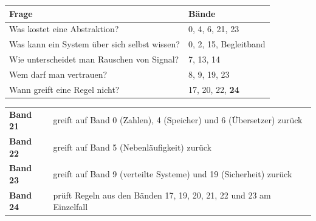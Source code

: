 \begin{technik}
\begin{center}
{\small
\renewcommand{\arraystretch}{1.45}
\begin{tabular}{@{}P{4.0cm}P{4.8cm}@{}}
\toprule
\textbf{Frage} & \textbf{Bände}\\
\midrule
Was kostet eine Abstraktion? & 0, 4, 6, 21, 23\\
Was kann ein System über sich selbst wissen? & 0, 2, 15, Begleitband\\
Wie unterscheidet man Rauschen von Signal? & 7, 13, 14\\
Wem darf man vertrauen? & 8, 9, 19, 23\\
Wann greift eine Regel nicht? & 17, 20, 22, \textbf{24}\\
\bottomrule
\end{tabular}}
\end{center}

\begin{center}
\begin{minipage}{0.86\textwidth}
\end{minipage}
\end{center}
\end{technik}

\begin{merksatz}
\begin{center}
{\small
\renewcommand{\arraystretch}{1.45}
\begin{tabular}{@{}P{2.4cm}P{6.4cm}@{}}
\toprule
\textbf{Band 21} & greift auf Band 0 (Zahlen), 4 (Speicher) und 6 (Übersetzer) zurück\\
\textbf{Band 22} & greift auf Band 5 (Nebenläufigkeit) zurück\\
\textbf{Band 23} & greift auf Band 9 (verteilte Systeme) und 19 (Sicherheit) zurück\\
\textbf{Band 24} & prüft Regeln aus den Bänden 17, 19, 20, 21, 22 und 23 am Einzelfall\\
\bottomrule
\end{tabular}}
\end{center}

\begin{center}
\begin{minipage}{0.86\textwidth}
\end{minipage}
\end{center}
\end{merksatz}
